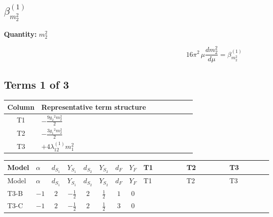 \documentclass[8pt]{article}
\begin{document}
\begin{landscape}
\section*{$\beta_{m_2^2}^{(1)}$}
\noindent\textbf{Quantity: }$m_2^2$\par\smallskip
\[16\pi^2\,\mu\frac{d m_2^2}{d\mu}=\beta_{m_2^2}^{(1)}\]
\subsection*{Terms 1 of 3}
\begin{center}
\begin{tabular}{@{}c >{\raggedright\arraybackslash}p{0.82\linewidth}@{}}
\toprule
Column & Representative term structure \\
\midrule
T1 & \(\displaystyle -\frac{9 {g_2}^2 {m_2^2}}{2}\) \\
\midrule
T2 & \(\displaystyle -\frac{3 {g_1}^2 {m_2^2}}{2}\) \\
\midrule
T3 & \(\displaystyle +4 {\lambda_{12}^{(1)}} {m_1^2}\) \\
\midrule
\bottomrule
\end{tabular}
\end{center}
\smallskip
\tiny
\begin{longtable}{@{}llcccccc >{\raggedright\arraybackslash}p{0.21\linewidth} >{\raggedright\arraybackslash}p{0.21\linewidth} >{\raggedright\arraybackslash}p{0.21\linewidth}@{}}
\toprule
Model & $\alpha$ & $d_{S_1}$ & $Y_{S_1}$ & $d_{S_2}$ & $Y_{S_2}$ & $d_F$ & $Y_F$ & T1 & T2 & T3 \\
\midrule
\endfirsthead
\toprule
Model & $\alpha$ & $d_{S_1}$ & $Y_{S_1}$ & $d_{S_2}$ & $Y_{S_2}$ & $d_F$ & $Y_F$ & T1 & T2 & T3 \\
\midrule
\endhead
T3-B & $-1$ & $2$ & $-\frac{1}{2}$ & $2$ & $\frac{1}{2}$ & $1$ & $0$ & \scriptsize\adjustbox{max width=\linewidth}{$\begin{gathered} -\frac{9 {g_2}^2 {m_2^2}}{2}\end{gathered}$} & \scriptsize\adjustbox{max width=\linewidth}{$\begin{gathered} -\frac{3 {g_1}^2 {m_2^2}}{2}\end{gathered}$} & \scriptsize\adjustbox{max width=\linewidth}{$\begin{gathered} +4 {\lambda_{12}^{(1)}} {m_1^2}\end{gathered}$} \\
\midrule
T3-C & $-1$ & $2$ & $-\frac{1}{2}$ & $2$ & $\frac{1}{2}$ & $3$ & $0$ & \scriptsize\adjustbox{max width=\linewidth}{$\begin{gathered} -\frac{9 {g_2}^2 {m_2^2}}{2}\end{gathered}$} & \scriptsize\adjustbox{max width=\linewidth}{$\begin{gathered} -\frac{3 {g_1}^2 {m_2^2}}{2}\end{gathered}$} & \scriptsize\adjustbox{max width=\linewidth}{$\begin{gathered} +4 {\lambda_{12}^{(1)}} {m_1^2}\end{gathered}$} \\

\end{longtable}
\end{landscape}
\end{document}
